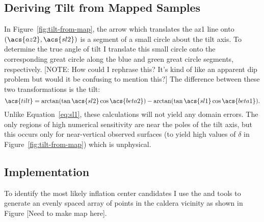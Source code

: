 \subsection{Deriving Tilt from Mapped Samples}
In Figure~\ref{fig:tilt-from-map}, the arrow which translates the \acs{az1} line onto $\left(\acs{az2},\acs{sl2}\right)$ is a segment of a small circle about the tilt axis. To determine the true angle of tilt I translate this small circle onto the corresponding great circle along the blue and green great circle segments, respectively. [NOTE: How could I rephrase this? It's kind of like an apparent dip problem but would it be confusing to mention this?] The difference between these two transformations is the tilt: 
\begin{equation}
    \acs{tilt} = \arctan(\tan\acs{sl2}\cos\acs{beta2}) - \arctan(\tan\acs{sl1}\cos\acs{beta1}).\label{eq:tilt-from-map}
\end{equation}
Unlike Equation~\eqref{eq:sl1}, these calculations will not yield any domain errors. The only regions of high numerical sensitivity are near the poles of the tilt axis, but this occurs only for near-vertical observed surfaces (to yield high values of $\delta$ in Figure~\ref{fig:tilt-from-map}) which is unphysical.

\subsection{Implementation}

To identify the most likely inflation center candidates I use the  and  tools to generate an evenly spaced array of points in the caldera vicinity as shown in Figure [Need to make map here].

